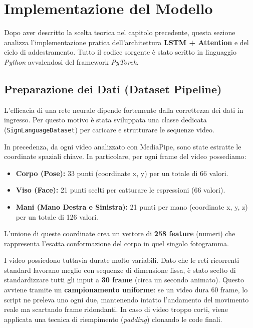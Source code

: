 
\section{Implementazione del Modello}

Dopo aver descritto la scelta teorica nel capitolo precedente, questa sezione analizza l'implementazione pratica dell'architettura \textbf{LSTM + Attention} e del ciclo di addestramento. Tutto il codice sorgente è stato scritto in linguaggio \textit{Python} avvalendosi del framework \textit{PyTorch}.

\subsection{Preparazione dei Dati (Dataset Pipeline)}
L'efficacia di una rete neurale dipende fortemente dalla correttezza dei dati in ingresso. Per questo motivo è stata sviluppata una classe dedicata (\texttt{SignLanguageDataset}) per caricare e strutturare le sequenze video.

In precedenza, da ogni video analizzato con MediaPipe, sono state estratte le coordinate spaziali chiave. In particolare, per ogni frame del video possediamo:
\begin{itemize}
    \item \textbf{Corpo (Pose):} 33 punti (coordinate x, y) per un totale di 66 valori.
    \item \textbf{Viso (Face):} 21 punti scelti per catturare le espressioni (66 valori).
    \item \textbf{Mani (Mano Destra e Sinistra):} 21 punti per mano (coordinate x, y, z) per un totale di 126 valori.
\end{itemize}
L'unione di queste coordinate crea un vettore di \textbf{258 feature} (numeri) che rappresenta l'esatta conformazione del corpo in quel singolo fotogramma.

I video possiedono tuttavia durate molto variabili. Dato che le reti ricorrenti standard lavorano meglio con sequenze di dimensione fissa, è stato scelto di standardizzare tutti gli input a \textbf{30 frame} (circa un secondo animato). Questo avviene tramite un \textbf{campionamento uniforme}: se un video dura 60 frame, lo script ne preleva uno ogni due, mantenendo intatto l'andamento del movimento reale ma scartando frame ridondanti. In caso di video troppo corti, viene applicata una tecnica di riempimento (\textit{padding}) clonando le code finali.

